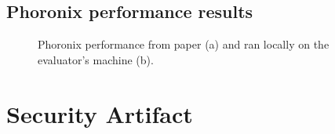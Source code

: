 \subsection{Phoronix performance results}
\begin{figure}[!h]
  \hfill
  \hfill
  \hfill
  \centering
  \caption{Phoronix performance from paper (a) and ran locally on the evaluator's machine (b).}
  \label{fig:phoronixosbench}
  \end{figure}

\section{Security Artifact}




